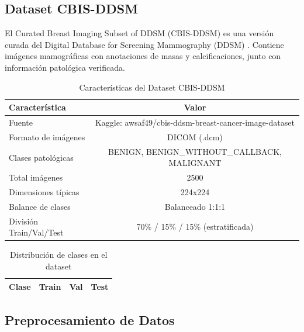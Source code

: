 \documentclass[12pt,a4paper]{article}
\begin{document}
\subsection{Dataset CBIS-DDSM}
\label{subsec:dataset}

El Curated Breast Imaging Subset of DDSM (CBIS-DDSM) es una versión curada del Digital Database 
for Screening Mammography (DDSM) \cite{lee2017curated}. Contiene imágenes mamográficas con 
anotaciones de masas y calcificaciones, junto con información patológica verificada.

\begin{table}[H]
\centering
\caption{Características del Dataset CBIS-DDSM}
\label{tab:dataset}
\begin{tabular}{lc}
\toprule
\textbf{Característica} & \textbf{Valor} \\
\midrule
Fuente & Kaggle: awsaf49/cbis-ddsm-breast-cancer-image-dataset \\
Formato de imágenes & DICOM (.dcm) \\
Clases patológicas & BENIGN, BENIGN\_WITHOUT\_CALLBACK, MALIGNANT \\
Total imágenes & 2500 \\
Dimensiones típicas & 224x224 \\
Balance de clases & Balanceado 1:1:1 \\
División Train/Val/Test & 70\% / 15\% / 15\% (estratificada) \\
\bottomrule
\end{tabular}
\end{table}

\begin{table}[H]
\centering
\caption{Distribución de clases en el dataset}
\label{tab:class_balance}
\begin{tabular}{lccc}
\toprule
\textbf{Clase} & \textbf{Train} & \textbf{Val} & \textbf{Test} \\
\midrule
\bottomrule
\end{tabular}
\end{table}

\subsection{Preprocesamiento de Datos}
\label{subsec:preprocesamiento}
\end{document}
